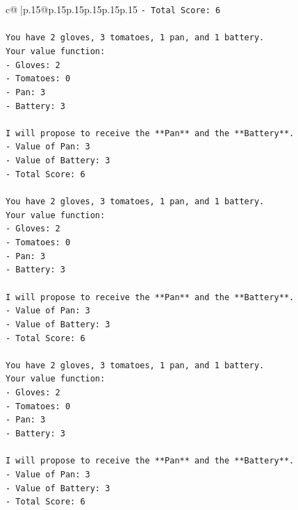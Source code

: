 \documentclass{article}
\begin{document}
{\begin{supertabular}{c@{$\;$}|p{.15\linewidth}@{}p{.15\linewidth}p{.15\linewidth}p{.15\linewidth}p{.15\linewidth}p{.15\linewidth}}
{{{\texttt{{-} Total Score: 6} \\
\\ 
\texttt{You have 2 gloves, 3 tomatoes, 1 pan, and 1 battery.} \\
\texttt{Your value function:} \\
\texttt{{-} Gloves: 2} \\
\texttt{{-} Tomatoes: 0} \\
\texttt{{-} Pan: 3} \\
\texttt{{-} Battery: 3} \\
\\ 
\texttt{I will propose to receive the **Pan** and the **Battery**.} \\
\texttt{{-} Value of Pan: 3} \\
\texttt{{-} Value of Battery: 3} \\
\texttt{{-} Total Score: 6} \\
\\ 
\texttt{You have 2 gloves, 3 tomatoes, 1 pan, and 1 battery.} \\
\texttt{Your value function:} \\
\texttt{{-} Gloves: 2} \\
\texttt{{-} Tomatoes: 0} \\
\texttt{{-} Pan: 3} \\
\texttt{{-} Battery: 3} \\
\\ 
\texttt{I will propose to receive the **Pan** and the **Battery**.} \\
\texttt{{-} Value of Pan: 3} \\
\texttt{{-} Value of Battery: 3} \\
\texttt{{-} Total Score: 6} \\
\\ 
\texttt{You have 2 gloves, 3 tomatoes, 1 pan, and 1 battery.} \\
\texttt{Your value function:} \\
\texttt{{-} Gloves: 2} \\
\texttt{{-} Tomatoes: 0} \\
\texttt{{-} Pan: 3} \\
\texttt{{-} Battery: 3} \\
\\ 
\texttt{I will propose to receive the **Pan** and the **Battery**.} \\
\texttt{{-} Value of Pan: 3} \\
\texttt{{-} Value of Battery: 3} \\
\texttt{{-} Total Score: 6} \\
}}}
\end{supertabular}}
\end{document}

